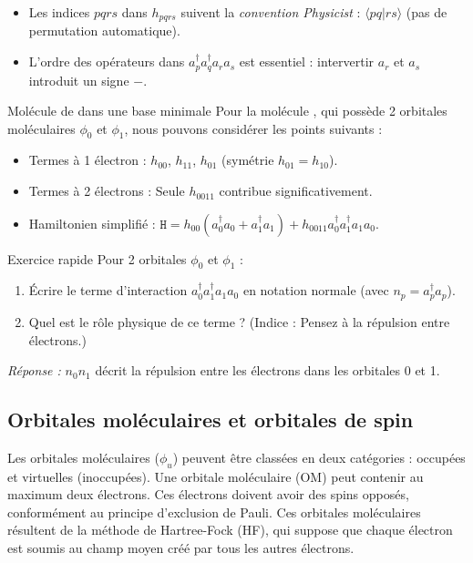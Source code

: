 \documentclass[12pt,a4paper,svgnames,x11names,rgb,table]{article} %
\numberwithin{equation}{section} %
\numberwithin{figure}{section} %
\numberwithin{table}{section} %
\begin{document}
\begin{marker}
\begin{itemize}
    \item Les indices $pqrs$ dans $h_{pqrs}$ suivent la \textit{convention Physicist} : $\langle pq|rs\rangle$ (pas de permutation automatique).
    \item L'ordre des opérateurs dans $a_p^\dagger a_q^\dagger a_r a_s$ est essentiel : intervertir $a_r$ et $a_s$ introduit un signe $-$.
\end{itemize}
\end{marker}

\begin{example}{Molécule de  dans une base minimale}{}
Pour la molécule , qui possède 2 orbitales moléculaires $\phi_0$ et $\phi_1$, nous pouvons considérer les points suivants :
\begin{itemize}
    \item Termes à 1 électron : $h_{00}$, $h_{11}$, $h_{01}$ (symétrie $h_{01}=h_{10}$).
    \item Termes à 2 électrons : Seule $h_{0011}$ contribue significativement.
    \item Hamiltonien simplifié : $\mathtt{H} = h_{00}(a_0^\dagger a_0 + a_1^\dagger a_1) + h_{0011} a_0^\dagger a_1^\dagger a_1 a_0$.
\end{itemize}
\end{example}

\begin{example}{Exercice rapide}{}
Pour 2 orbitales $\phi_0$ et $\phi_1$ :
\begin{enumerate}
    \item Écrire le terme d'interaction $a_0^\dagger a_1^\dagger a_1 a_0$ en notation normale (avec $n_p = a_p^\dagger a_p$).
    \item Quel est le rôle physique de ce terme ? (Indice : Pensez à la répulsion entre électrons.)
\end{enumerate}
\tcblower
\footnotesize \textit{Réponse :} $n_0 n_1$ décrit la répulsion entre les électrons dans les orbitales 0 et 1.
\end{example}

\subsection{Orbitales moléculaires et orbitales de spin} 

Les orbitales moléculaires ($\phi_u$) peuvent être classées en deux catégories : occupées et virtuelles (inoccupées). Une orbitale moléculaire (OM) peut contenir au maximum deux électrons. Ces électrons doivent avoir des spins opposés, conformément au principe d'exclusion de Pauli. Ces orbitales moléculaires résultent de la méthode de Hartree-Fock (HF), qui suppose que chaque électron est soumis au champ moyen créé par tous les autres électrons.
\end{document}
